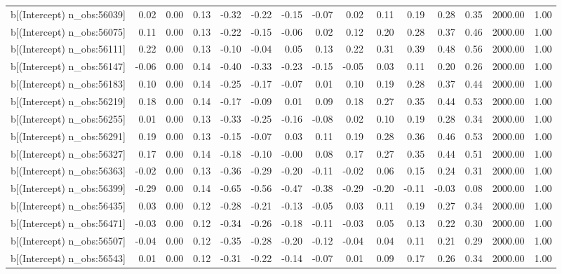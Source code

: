 \begin{table}[ht]
\begin{tabular}{rrrrrrrrrrrrrrr}
  b[(Intercept) n\_obs:56039] & 0.02 & 0.00 & 0.13 & -0.32 & -0.22 & -0.15 & -0.07 & 0.02 & 0.11 & 0.19 & 0.28 & 0.35 & 2000.00 & 1.00 \\ 
  b[(Intercept) n\_obs:56075] & 0.11 & 0.00 & 0.13 & -0.22 & -0.15 & -0.06 & 0.02 & 0.12 & 0.20 & 0.28 & 0.37 & 0.46 & 2000.00 & 1.00 \\ 
  b[(Intercept) n\_obs:56111] & 0.22 & 0.00 & 0.13 & -0.10 & -0.04 & 0.05 & 0.13 & 0.22 & 0.31 & 0.39 & 0.48 & 0.56 & 2000.00 & 1.00 \\ 
  b[(Intercept) n\_obs:56147] & -0.06 & 0.00 & 0.14 & -0.40 & -0.33 & -0.23 & -0.15 & -0.05 & 0.03 & 0.11 & 0.20 & 0.26 & 2000.00 & 1.00 \\ 
  b[(Intercept) n\_obs:56183] & 0.10 & 0.00 & 0.14 & -0.25 & -0.17 & -0.07 & 0.01 & 0.10 & 0.19 & 0.28 & 0.37 & 0.44 & 2000.00 & 1.00 \\ 
  b[(Intercept) n\_obs:56219] & 0.18 & 0.00 & 0.14 & -0.17 & -0.09 & 0.01 & 0.09 & 0.18 & 0.27 & 0.35 & 0.44 & 0.53 & 2000.00 & 1.00 \\ 
  b[(Intercept) n\_obs:56255] & 0.01 & 0.00 & 0.13 & -0.33 & -0.25 & -0.16 & -0.08 & 0.02 & 0.10 & 0.19 & 0.28 & 0.34 & 2000.00 & 1.00 \\ 
  b[(Intercept) n\_obs:56291] & 0.19 & 0.00 & 0.13 & -0.15 & -0.07 & 0.03 & 0.11 & 0.19 & 0.28 & 0.36 & 0.46 & 0.53 & 2000.00 & 1.00 \\ 
  b[(Intercept) n\_obs:56327] & 0.17 & 0.00 & 0.14 & -0.18 & -0.10 & -0.00 & 0.08 & 0.17 & 0.27 & 0.35 & 0.44 & 0.51 & 2000.00 & 1.00 \\ 
  b[(Intercept) n\_obs:56363] & -0.02 & 0.00 & 0.13 & -0.36 & -0.29 & -0.20 & -0.11 & -0.02 & 0.06 & 0.15 & 0.24 & 0.31 & 2000.00 & 1.00 \\ 
  b[(Intercept) n\_obs:56399] & -0.29 & 0.00 & 0.14 & -0.65 & -0.56 & -0.47 & -0.38 & -0.29 & -0.20 & -0.11 & -0.03 & 0.08 & 2000.00 & 1.00 \\ 
  b[(Intercept) n\_obs:56435] & 0.03 & 0.00 & 0.12 & -0.28 & -0.21 & -0.13 & -0.05 & 0.03 & 0.11 & 0.19 & 0.27 & 0.34 & 2000.00 & 1.00 \\ 
  b[(Intercept) n\_obs:56471] & -0.03 & 0.00 & 0.12 & -0.34 & -0.26 & -0.18 & -0.11 & -0.03 & 0.05 & 0.13 & 0.22 & 0.30 & 2000.00 & 1.00 \\ 
  b[(Intercept) n\_obs:56507] & -0.04 & 0.00 & 0.12 & -0.35 & -0.28 & -0.20 & -0.12 & -0.04 & 0.04 & 0.11 & 0.21 & 0.29 & 2000.00 & 1.00 \\ 
  b[(Intercept) n\_obs:56543] & 0.01 & 0.00 & 0.12 & -0.31 & -0.22 & -0.14 & -0.07 & 0.01 & 0.09 & 0.17 & 0.26 & 0.34 & 2000.00 & 1.00 \\ 

\end{tabular}
\end{table}
